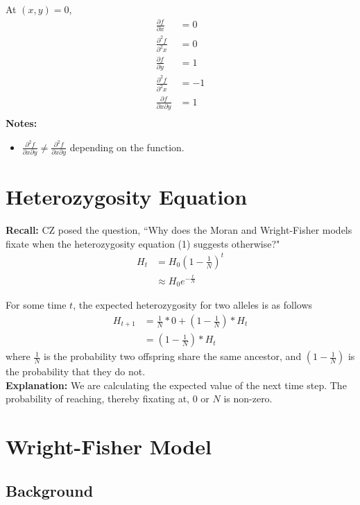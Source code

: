 \documentclass[12pt]{extarticle}
\newcommand{\<}{\langle}
\renewcommand{\>}{\rangle}
\theoremstyle{definition}
\begin{document}
At $(x, y) = 0$, 
\begin{align}
    \frac{\partial f}{\partial x} &= 0\\
    \frac{\partial^2 f}{\partial^2 x} &= 0\\
    \frac{\partial f}{\partial y} &= 1\\
    \frac{\partial^2 f}{\partial^2 x} &= -1\\
    \frac{\partial f}{\partial x \partial y} &= 1\\
\end{align}
\textbf{Notes:}
\begin{itemize}
    \item $\frac{\partial^2 f}{\partial x \partial y} \neq \frac{\partial^2 f}{\partial x \partial y}$ depending on the function.
\end{itemize}

\section{Heterozygosity Equation}

\textbf{Recall:} CZ posed the question, ``Why does the Moran and Wright-Fisher models fixate when the heterozygosity equation (1) suggests otherwise?"
\begin{align}
    H_t &= H_0(1 - \frac{1}{N})^t \nonumber \\
    &\approx H_0e^{-\frac{t}{N}} \label{H_0}
\end{align}

\noindent For some time $t$, the expected heterozygosity for two alleles is as follows
\begin{align}
    H_{t + 1} &= \frac{1}{N}*0 + (1 - \frac{1}{N})*H_t \nonumber \\
    &= (1 - \frac{1}{N})*H_t \label{H_t}
\end{align}
where $\frac{1}{N}$ is the probability two offspring share the same ancestor, and $(1 - \frac{1}{N})$ is the probability that they do not.\\

\noindent \textbf{Explanation:} We are calculating the expected value of the next time step. The probability of reaching, thereby fixating at, $0$ or $N$ is non-zero.

\section{Wright-Fisher Model}

\subsection{Background}
\end{document}
